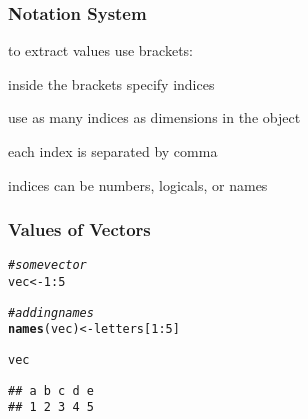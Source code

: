 \documentclass[12pt]{beamer}\usepackage[]{graphicx}\usepackage[]{color}
\makeatletter
\newcommand{\hlnum}[1]{\textcolor[rgb]{0.686,0.059,0.569}{#1}}%
\newcommand{\hlcom}[1]{\textcolor[rgb]{0.678,0.584,0.686}{\textit{#1}}}%
\newcommand{\hlopt}[1]{\textcolor[rgb]{0,0,0}{#1}}%
\newcommand{\hlstd}[1]{\textcolor[rgb]{0.345,0.345,0.345}{#1}}%
\newcommand{\hlkwb}[1]{\textcolor[rgb]{0.69,0.353,0.396}{#1}}%
\newcommand{\hlkwd}[1]{\textcolor[rgb]{0.737,0.353,0.396}{\textbf{#1}}}%
\newenvironment{kframe}{%
 \def\at@end@of@kframe{}%
 \ifinner\ifhmode%
  \def\at@end@of@kframe{\end{minipage}}%
  \begin{minipage}{\columnwidth}%
 \fi\fi%
 \def\FrameCommand##1{\hskip\@totalleftmargin \hskip-\fboxsep
 \colorbox{shadecolor}{##1}\hskip-\fboxsep
     \hskip-\linewidth \hskip-\@totalleftmargin \hskip\columnwidth}%
 \MakeFramed {\advance\hsize-\width
   \@totalleftmargin\z@ \linewidth\hsize
   \@setminipage}}%
 {\par\unskip\endMakeFramed%
 \at@end@of@kframe}
\newenvironment{knitrout}{}{} %
\makeatother
\begin{document}

\begin{frame}
\frametitle{Notation System}

\bbi
  \item to extract values use brackets: \code{[ ]}
  \item inside the brackets specify indices
  \item use as many indices as dimensions in the object
  \item each index is separated by comma
  \item indices can be numbers, logicals, or names
\ei
\eb
\end{frame}


\begin{frame}[fragile]
\frametitle{Values of Vectors}

\begin{knitrout}\footnotesize
{}\color{fgcolor}\begin{kframe}
\begin{alltt}
\hlcom{# some vector}
\hlstd{vec} \hlkwb{<-} \hlnum{1}\hlopt{:}\hlnum{5}

\hlcom{# adding names}
\hlkwd{names}\hlstd{(vec)} \hlkwb{<-} \hlstd{letters[}\hlnum{1}\hlopt{:}\hlnum{5}\hlstd{]}

\hlstd{vec}
\end{alltt}
\begin{verbatim}
## a b c d e 
## 1 2 3 4 5
\end{verbatim}
\end{kframe}
\end{knitrout}

\end{frame}

\end{document}
